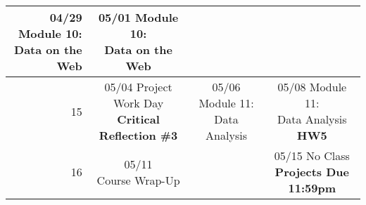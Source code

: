 \documentclass[11pt]{article}
\begin{document}
\begin{tabular}{| r | c | c | c |}
	\makecell{04/29 Module 10:\\Data on the Web} &
	\makecell{05/01 Module 10:\\Data on the Web} \\
	\hline 15 &
	\makecell{05/04 Project Work Day\\\textbf{Critical Reflection \#3}} &
	\makecell{05/06 Module 11:\\Data Analysis} &
	\makecell{05/08 Module 11:\\Data Analysis \textbf{HW5}} \\
	\hline 16 &
	\makecell{05/11\\Course Wrap-Up} & 
	\makecell{} & 
	\makecell{05/15 No Class\\\textbf{Projects Due 11:59pm}}\\
	\hline
\end{tabular}
\end{document}
